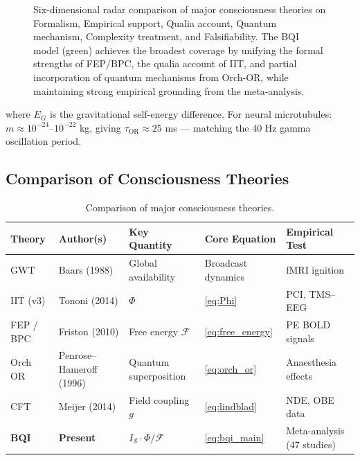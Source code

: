 \documentclass[12pt,a4paper]{article}
\theoremstyle{plain}
\theoremstyle{definition}
\theoremstyle{remark}
\newcommand{\vF}{\mathcal{F}}
\newcommand{\vS}{\mathcal{S}}
\begin{document}
\begin{figure}[H]
\caption{Six-dimensional radar comparison of major consciousness theories on
  Formalism, Empirical support, Qualia account, Quantum mechanism, Complexity
  treatment, and Falsifiability.  The BQI model (green) achieves the broadest
  coverage by unifying the formal strengths of FEP/BPC, the qualia account of
  IIT, and partial incorporation of quantum mechanisms from Orch-OR, while
  maintaining strong empirical grounding from the meta-analysis.}
\label{fig:theory_radar}
\end{figure}



where $E_G$ is the gravitational self-energy difference. For neural microtubules:
$m \approx 10^{-24}$--$10^{-22}$ kg, giving $\tau_{\text{OR}} \approx 25$ ms —
matching the $40$ Hz gamma oscillation period.

\subsection{Comparison of Consciousness Theories}

\begin{table}[htbp]
\centering
\caption{Comparison of major consciousness theories.}
\label{tab:theory_compare}
\renewcommand{\arraystretch}{1.3}
\begin{tabular}{p{2.0cm}p{2.0cm}p{2.5cm}p{3cm}p{3cm}}
\toprule
\rowcolor{hdrcol}
\color{white}\textbf{Theory} &
\color{white}\textbf{Author(s)} &
\color{white}\textbf{Key Quantity} &
\color{white}\textbf{Core Equation} &
\color{white}\textbf{Empirical Test} \\
\midrule
GWT             & Baars (1988)              & Global availability    & Broadcast dynamics         & fMRI ignition \\
IIT (v3)        & Tononi (2014)             & $\Phi$                 & \cref{eq:Phi}              & PCI, TMS--EEG \\
FEP / BPC       & Friston (2010)            & Free energy $\vF$      & \cref{eq:free_energy}      & PE BOLD signals \\
Orch OR         & Penrose--Hameroff (1996)  & Quantum superposition  & \cref{eq:orch_or}          & Anaesthesia effects \\
CFT             & Meijer (2014)             & Field coupling $g$     & \cref{eq:lindblad}         & NDE, OBE data \\
\textbf{BQI}    & \textbf{Present}          & $I_\vS \cdot \Phi/\vF$ & \cref{eq:bqi_main}         & Meta-analysis (47 studies) \\
\bottomrule
\end{tabular}
\end{table}
\end{document}
